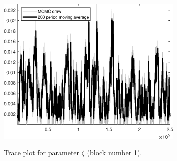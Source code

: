 \begin{figure}[H]
\centering
  \includegraphics[width=0.8\textwidth]{BRS_imp_mobility_alt/graphs/TracePlot_zeta_blck_1}\\
    \caption{Trace plot for parameter ${\zeta}$ (block number 1).}
\end{figure}
